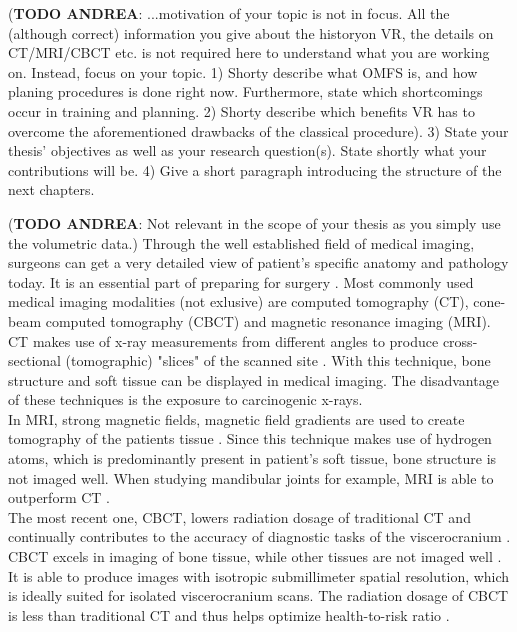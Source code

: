 (\textbf{TODO ANDREA}: ...motivation of your topic is not in focus. All the (although correct) information you give about the historyon VR, the details on CT/MRI/CBCT etc. is not required here to understand what you are working on.
Instead, focus on your topic.
1) Shorty describe what OMFS is, and how planing procedures is done right now.
Furthermore, state which shortcomings occur in training and planning.
2) Shorty describe which benefits VR has to overcome the aforementioned drawbacks of the classical procedure).
3) State your thesis' objectives as well as your research question(s).
State shortly what your contributions will be.
4) Give a short paragraph introducing the structure of the next chapters.

(\textbf{TODO ANDREA}: Not relevant in the scope of your thesis as you simply use the volumetric data.)
Through the well established field of medical imaging, surgeons can get a very detailed view of patient’s specific anatomy and pathology today. 
It is an essential part of preparing for surgery \cite{Steinbacher.2015}.
Most commonly used medical imaging modalities (not exlusive) are computed tomography (CT), cone-beam computed tomography (CBCT) and magnetic resonance imaging (MRI).
CT makes use of x-ray measurements from different angles to produce cross-sectional (tomographic) "slices" of the scanned site \cite{Handels.2009}.
With this technique, bone structure and soft tissue can be displayed in medical imaging.
The disadvantage of these techniques is the exposure to carcinogenic x-rays.
\\
In MRI, strong magnetic fields, magnetic field gradients are used to create tomography of the patients tissue \cite{Handels.2009}.
Since this technique makes use of hydrogen atoms, which is predominantly present in patient's soft tissue, bone structure is not imaged well.
When studying mandibular joints for example, MRI is able to outperform CT \cite{RN65}.
\\
The most recent one, CBCT, lowers radiation dosage of traditional CT and continually contributes to the accuracy of diagnostic tasks of the viscerocranium \cite{Vos.2009}.
CBCT excels in imaging of bone tissue, while other tissues are not imaged well \cite{Vos.2009}.
It is able to produce images with isotropic submillimeter spatial resolution, which is ideally suited for isolated viscerocranium scans. 
The radiation dosage of CBCT is less than traditional CT and thus helps optimize health-to-risk ratio \cite{WHITE2008689}.

